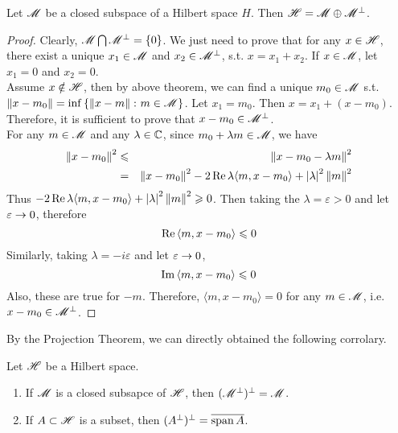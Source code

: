 \documentclass[a4paper,11pt]{report}
\begin{document}
\begin{thm}
	Let $\mathscr{M}$ be a closed subspace of a Hilbert space $H$. Then $\mathscr{H} = \mathscr{M} \oplus \mathscr{M}^{\bot}$.
\end{thm}
\begin{proof}
	Clearly, $\mathscr{M} \bigcap \mathscr{M}^{\bot} = \{0\}$. We just need to prove that for any $x \in \mathscr{H}$, there exist a unique $x_1 \in \mathscr{M}$ and $x_2 \in \mathscr{M}^{\bot}$, s.t. $x=x_1+x_2$. If $x \in \mathscr{M}$, let $x_1=0$ and $x_2=0$.\\
	Assume $x \notin \mathscr{H}$, then by above theorem, we can find a unique $m_0 \in \mathscr{M}$ s.t. $\left\lVert x-m_0\right\lVert=\operatorname{inf}{\{\left\lVert x-m\right\lVert \colon m \in \mathscr{M}\}}$. Let $x_1 = m_0$. Then $x=x_1 + (x-m_0)$. Therefore, it is sufficient to prove that $x-m_0 \in \mathscr{M}^{\bot}$.\\
	For any $m \in \mathscr{M}$ and any $\lambda \in \mathbb{C}$, since $m_0+\lambda m \in \mathscr{M}$, we have
	\begin{eqnarray*}
		\left\lVert x-m_0\right\lVert^{2} &\leqslant& \left\lVert x-m_0-\lambda m\right\lVert^{2} \\
		&=& \left\lVert x-m_0\right\lVert^{2} -2\operatorname{Re}{\lambda \langle m,x-m_0 \rangle} + \left\lvert\lambda\right\lvert^{2}\left\lVert m\right\lVert^{2}
	\end{eqnarray*}
	Thus $-2\operatorname{Re}{\lambda \langle m,x-m_0 \rangle} + \left\lvert\lambda\right\lvert^{2}\left\lVert m\right\lVert^{2} \geqslant 0$. Then taking the $\lambda = \varepsilon  > 0$ and let $\varepsilon \rightarrow 0$, therefore
	\begin{equation*}
		\operatorname{Re}{ \langle m,x-m_0 \rangle} \leqslant 0
	\end{equation*}
	Similarly, taking $\lambda = -i \varepsilon$ and let $\varepsilon \rightarrow 0$,
	\begin{equation*}
		\operatorname{Im}{ \langle m,x-m_0 \rangle} \leqslant 0
	\end{equation*}
	Also, these are true for $-m$. Therefore, $ \langle m,x-m_0 \rangle = 0$ for any $m \in \mathscr{M}$, i.e. $x-m_0 \in \mathscr{M}^{\bot}$.
\end{proof}
By the Projection Theorem, we can directly obtained the following corrolary.
\begin{cor} \label{cor4}
	Let $\mathscr{H}$ be a Hilbert space.
	\begin{enumerate}[label=\arabic*)]
		\item If $\mathscr{M}$ is a closed subsapce of $\mathscr{H}$, then $(\mathscr{M}^{\bot})^{\bot} = \mathscr{M}$.
		\item If $A \subset \mathscr{H}$ is a subset, then $(A^{\bot})^{\bot} = \overline{\operatorname{span}{A}}$.
	\end{enumerate}
\end{cor}
\end{document}
